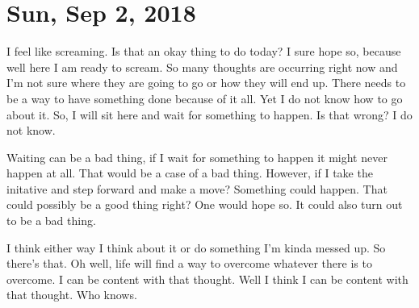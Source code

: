 \section{Sun, Sep 2, 2018}

I feel like screaming. Is that an okay thing to do today? I sure hope so, because
well here I am ready to scream. So many thoughts are occurring right now and I'm not
sure where they are going to go or how they will end up. There needs to be a way to
have something done because of it all. Yet I do not know how to go about it. So, I
will sit here and wait for something to happen. Is that wrong? I do not know.

Waiting can be a bad thing, if I wait for something to happen it might never happen
at all. That would be a case of a bad thing. However, if I take the initative and
step forward and make a move? Something could happen. That could possibly be a good
thing right? One would hope so. It could also turn out to be a bad thing.

I think either way I think about it or do something I'm kinda messed up. So there's
that. Oh well, life will find a way to overcome whatever there is to overcome. I can
be content with that thought. Well I think I can be content with that thought. Who
knows.